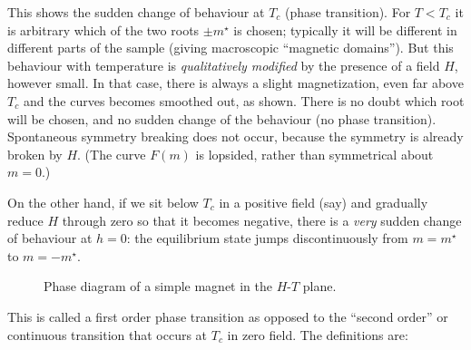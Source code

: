 \documentclass[
  letterpaper,
  enabledeprecatedfontcommands]{report}
\begin{document}
This shows the sudden change of behaviour at \(T_c\) (phase transition).
For \(T<T_c\) it is arbitrary which of the two roots \(\pm m^\star\) is
chosen; typically it will be different in different parts of the sample
(giving macroscopic ``magnetic domains''). But this behaviour with
temperature is \emph{qualitatively modified} by the presence of a field
\(H\), however small. In that case, there is always a slight
magnetization, even far above \(T_c\) and the curves becomes smoothed
out, as shown. There is no doubt which root will be chosen, and no
sudden change of the behaviour (no phase transition). Spontaneous
symmetry breaking does not occur, because the symmetry is already broken
by \(H\). (The curve \(F(m)\) is lopsided, rather than symmetrical about
\(m=0\).)

On the other hand, if we sit below \(T_c\) in a positive field (say) and
gradually reduce \(H\) through zero so that it becomes negative, there
is a \emph{very} sudden change of behaviour at \(h=0\): the equilibrium
state jumps discontinuously from \(m=m^\star\) to \(m=-m^\star\).

\begin{figure}


\caption{\label{fig-isingpdH}Phase diagram of a simple magnet in the
\(H\)-\(T\) plane.}

\end{figure}%

This is called a first order phase transition as opposed to the ``second
order'' or continuous transition that occurs at \(T_c\) in zero field.
The definitions are:
\end{document}
